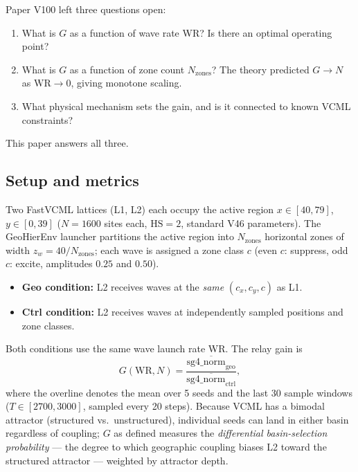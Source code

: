 \documentclass[11pt]{article}
\begin{document}
Paper V100 left three questions open:
\begin{enumerate}
  \item What is $G$ as a function of wave rate WR? Is there an optimal operating point?
  \item What is $G$ as a function of zone count $N_{\mathrm{zones}}$?
    The theory predicted $G \to N$ as $\mathrm{WR} \to 0$, giving monotone scaling.
  \item What physical mechanism sets the gain, and is it connected to known VCML constraints?
\end{enumerate}

This paper answers all three.

\subsection*{Setup and metrics}

Two FastVCML lattices (L1, L2) each occupy the active region $x \in [40, 79]$,
$y \in [0, 39]$ ($N = 1600$ sites each, $\mathrm{HS}=2$, standard V46 parameters).
The GeoHierEnv launcher partitions the active region into $N_{\mathrm{zones}}$ horizontal
zones of width $z_w = 40/N_{\mathrm{zones}}$; each wave is assigned a zone class $c$
(even $c$: suppress, odd $c$: excite, amplitudes $0.25$ and $0.50$).
\begin{itemize}
  \item \textbf{Geo condition:} L2 receives waves at the \emph{same} $(c_x, c_y, c)$ as L1.
  \item \textbf{Ctrl condition:} L2 receives waves at independently sampled positions
    and zone classes.
\end{itemize}
Both conditions use the same wave launch rate WR. The relay gain is
\begin{equation}
  G(\mathrm{WR}, N) = \frac{\overline{\mathrm{sg4\_norm}_{\mathrm{geo}}}}{\overline{\mathrm{sg4\_norm}_{\mathrm{ctrl}}}},
\end{equation}
where the overline denotes the mean over 5 seeds and the last 30 sample windows
($T \in [2700, 3000]$, sampled every 20 steps).
Because VCML has a bimodal attractor (structured vs.\ unstructured), individual seeds
can land in either basin regardless of coupling; $G$ as defined measures the
\emph{differential basin-selection probability} --- the degree to which geographic coupling
biases L2 toward the structured attractor --- weighted by attractor depth.

\end{document}
